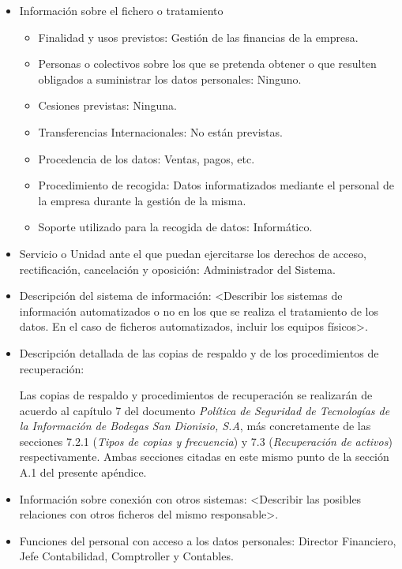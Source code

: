 \documentclass[a4paper,11pt,bibtotoc,noliststotoc]{scrbook}
\begin{document}
\begin{itemize}
\item Información sobre el fichero o tratamiento
	\begin{itemize}
	\item Finalidad y usos previstos: Gestión de las financias de la empresa.
	\item Personas o colectivos sobre los que se pretenda obtener o que resulten obligados a suministrar los datos personales: Ninguno.
	\item Cesiones previstas: Ninguna.
	\item Transferencias Internacionales: No están previstas.
	\item Procedencia de los datos: Ventas, pagos, etc.
	\item Procedimiento de recogida: Datos informatizados mediante el personal de la empresa durante la gestión de la misma.
	\item Soporte utilizado para la recogida de datos: Informático.
	\end{itemize}

\item Servicio o Unidad ante el que puedan ejercitarse los derechos de acceso, rectificación, cancelación y oposición: Administrador del Sistema.

\item Descripción del sistema de información: <Describir los sistemas de información automatizados o no en los que se realiza el tratamiento de los datos. En el caso de ficheros automatizados, incluir los equipos físicos>.

\item Descripción detallada de las copias de respaldo y de los procedimientos de recuperación:

Las copias de respaldo y procedimientos de recuperación se realizarán de acuerdo al capítulo 7 del documento \emph{Política de Seguridad de Tecnologías de la Información de Bodegas San Dionisio, S.A}, más concretamente de las secciones 7.2.1 (\emph{Tipos de copias y frecuencia}) y 7.3 (\emph{Recuperación de activos}) respectivamente. Ambas secciones citadas en este mismo punto de la sección A.1 del presente apéndice.

\item Información sobre conexión con otros sistemas: <Describir las posibles relaciones con otros ficheros del mismo responsable>.

\item Funciones del personal con acceso a los datos personales: Director Financiero, Jefe Contabilidad, Comptroller y Contables.


\end{itemize}
\end{document}
